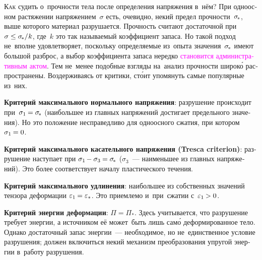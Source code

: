 \begin{otherlanguage}{russian}

\lettrine[lines=2, findent=2pt, nindent=0pt]{К}{ак} судить о~прочности тела после определения напряжения в~нём? При одноосном растяжении напряжением~$\sigma$ есть, очевидно, некий предел прочности~${\sigma_{\hspace{-0.25ex}*}}$, выше которого материал разрушается. Прочность считают достаточной при~${\sigma \leq \sigma_{\hspace{-0.25ex}*} / \hspace{.1ex} k}$, где~$k$ это так называемый коэффициент запаса. Но такой подход не~вполне удовлетворяет, поскольку определяемые из~опыта значения~${\sigma_{\hspace{-0.25ex}*}}$ имеют большой разброс, а выбор коэффициента запаса нередко \textcolor{magenta}{становится административным актом}. Тем не~менее подобные взгляды на~анализ прочности широк\'{о} распространены. Воздерживаясь от критики, ст\'{о}ит упомянуть самые популярные из~них.

\textbf{Критерий максимального нормального напряжения}: разрушение происходит при~${\sigma_1 \hspace{-0.12ex} = \sigma_{\hspace{-0.25ex}*}}$ (наибольшее из главных напряжений достигает предельного значения). Но это положение несправедливо для одноосного сжатия, при котором ${\sigma_1 \hspace{-0.12ex} = 0}$.

\textbf{Критерий максимального касательного напряжения (Tresca criterion)}: разрушение наступает при ${\sigma_1 \hspace{-0.16ex} - \sigma_3 \hspace{-0.1ex} = \sigma_{\hspace{-0.25ex}*}}$ ($\sigma_3$~--- наименьшее из главных напряжений). Это более соответствует началу пластического течения.

\textbf{Критерий максимального удлинения}: наибольшее из собственных значений тензора деформации ${\varepsilon_1 \hspace{-0.12ex} = \varepsilon_*}$. Это приемлемо и~при~сжатии с~${\varepsilon_1 \hspace{-0.12ex} > 0}$.

\textbf{Критерий энергии деформации}: ${\Pi = \Pi_*}$. Здесь учитывается, что разрушение требует энергии, а источником её может~быть лишь сам\'{о} деформированное тело. Однако достаточный запас энергии~--- необходимое, но не~единственное условие разрушения; должен включиться некий механизм преобразования упругой энергии в~работу разрушения.


\end{otherlanguage}
